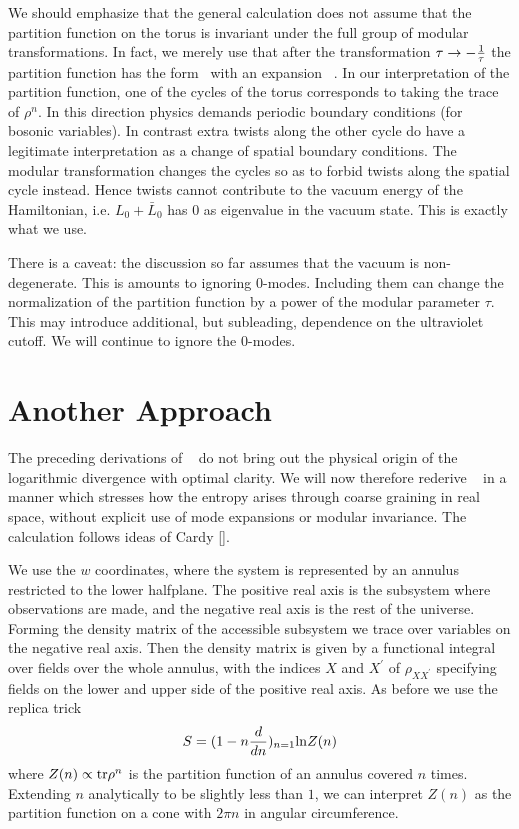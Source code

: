 We should emphasize that the general calculation does not assume
that the partition function on the torus is invariant under the
full group of modular transformations. In fact, we merely use that
after the transformation $\tau\rightarrow -{1\over\tau}$ the partition
function has the form \general\ with an expansion \expansion\ .
In our interpretation of the partition function,
one of the cycles of the torus corresponds to taking the trace of
$\rho^n$. In this direction physics demands periodic boundary conditions
(for bosonic variables). In contrast extra twists along the other cycle
do have a legitimate interpretation as a change of spatial boundary
conditions. The modular transformation changes the cycles so as to
forbid twists along the spatial cycle instead. Hence
twists cannot contribute to the vacuum energy of the Hamiltonian, i.e.
$L_0 + \bar{L}_0$ has 0 as eigenvalue in the vacuum state. This is
exactly what we use.

There is a caveat: the discussion so far assumes that the
vacuum is non-degenerate. This is amounts to ignoring 0-modes.
Including them can change the normalization of the partition function
by a power of the modular parameter $\tau$. This may introduce additional,
but subleading, dependence on the ultraviolet cutoff.
We will continue to ignore the 0-modes.

\section{Another Approach}

The preceding derivations of \se~ do not bring out
the physical origin of the
logarithmic divergence with optimal clarity.
We will now therefore rederive \se~ in a manner which stresses
how the entropy arises through coarse graining
in real space, without explicit use of mode
expansions or modular invariance.
The calculation follows ideas of Cardy [\cardy ].

We use the $w$ coordinates, where the system is represented by
an annulus restricted to the lower halfplane.
The positive real axis is the subsystem where observations are
made, and the negative real axis is the rest of the universe.
Forming the density
matrix of the accessible subsystem we trace over variables on the negative
real axis. Then the density matrix is given by a functional integral over
fields over the whole annulus, with the indices $X$ and $X^{\prime}$
of $\rho_{XX^{\prime}}$ specifying fields on
the lower and upper side of the positive real axis.
As before we use the replica trick
$$
S=(1-n{d\over dn})_{n=1}{\rm ln}Z(n)
$$
where $Z(n)\propto{\rm tr}\rho^n$ is the partition function
of an annulus covered $n$ times.
Extending $n$ analytically to be slightly
less than $1$, we can interpret $Z(n)$ as the partition
function on a cone with $2\pi n$ in angular circumference.

